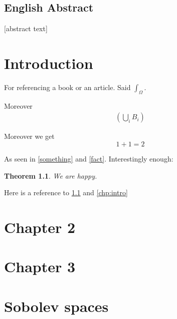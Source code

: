 \documentclass[english,a4paper,12pt,oneside]{scrbook}
\theoremstyle{break}
\newtheorem{thm}[equation]{Theorem}
\theoremstyle{remark}
\newcommand{\ds}{\displaystyle}
\begin{document}
\section*{English Abstract}
[abstract text]
\newpage
\tableofcontents  


\chapter{Introduction}  \setcounter{page}{1}   %
\label{chp:intro}
For referencing a book or an article. Said $ \ds \int_\Omega $.

Moreover 
\begin{align}
\label{something}
\left ( \bigcup_i B_i \right )
\end{align}

Moreover we get 
\begin{equation}
\label{fact}
	1+1=2
\end{equation}

As seen in \ref{something} and \cref{fact}. Interestingly enough:

\begin{thm}
\label{thm:obvious}
	We are happy.
\end{thm}

Here is a reference to \cref{thm:obvious} and \cref{chp:intro}

\chapter{Chapter 2}

\chapter{Chapter 3}

\appendix

\chapter{Sobolev spaces}
\end{document}
